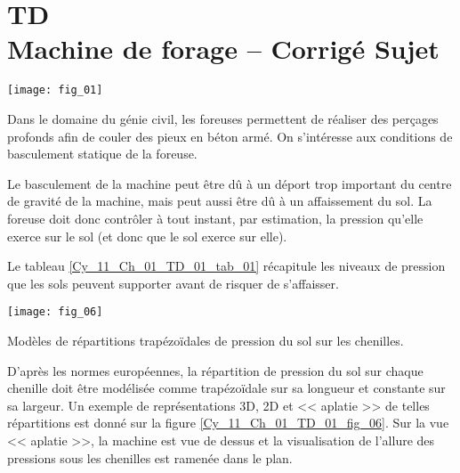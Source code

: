 \chapter*{TD  \\ 
Machine de forage -- \ifprof Corrigé \else Sujet \fi}

\iflivret {} \else
\ifprof  {} \else \fi
\fi

\setcounter{question}{0}

\begin{marginfigure}
\texttt{[image: fig\_01]}
\end{marginfigure}


Dans le domaine du génie civil, les foreuses permettent de réaliser des perçages profonds afin de couler des pieux en béton armé. On s'intéresse aux conditions de basculement statique de la foreuse. 

Le basculement de la machine peut être dû à un déport trop important du centre de gravité 
de la machine, mais peut aussi être dû à un affaissement du sol. La foreuse doit donc contrôler à tout instant, par estimation, la pression qu’elle exerce sur le sol (et donc que le sol exerce sur elle). 

Le tableau \ref{Cy_11_Ch_01_TD_01_tab_01} récapitule les niveaux de pression que les sols peuvent supporter avant de risquer de s’affaisser. 




\begin{marginfigure}
\centering
\texttt{[image: fig\_06]}
\caption{Modèles de répartitions trapézoïdales de pression du sol sur les chenilles. \label{Cy_11_Ch_01_TD_01_fig_06}}
\end{marginfigure}

D’après les normes européennes, 
la répartition de pression du sol sur 
chaque chenille doit être modélisée 
comme trapézoïdale sur sa longueur et 
constante sur sa largeur. Un exemple 
de représentations 3D, 2D et << aplatie >> 
de telles répartitions est 
donné sur la figure \ref{Cy_11_Ch_01_TD_01_fig_06}. Sur la vue 
<< aplatie >>, la machine est vue de 
dessus et la visualisation de l’allure des 
pressions sous les chenilles est 
ramenée dans le plan.%


